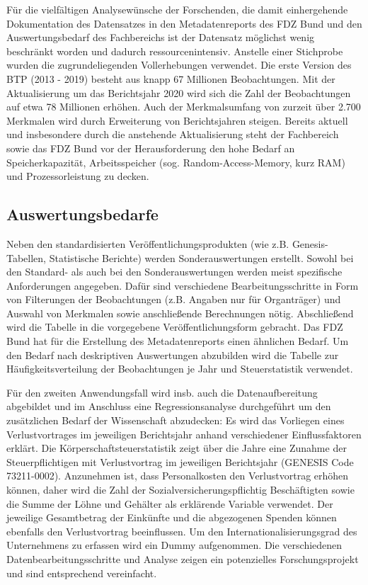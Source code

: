 \documentclass[
  german,
  10pt,
  twoside]{article}
\begin{document}
Für die vielfältigen Analysewünsche der Forschenden, die damit
einhergehende Dokumentation des Datensatzes in den Metadatenreports
\autocite{fdz2024btp} des FDZ Bund und den Auswertungsbedarf des
Fachbereichs ist der Datensatz möglichst wenig beschränkt worden und
dadurch ressourcenintensiv. Anstelle einer Stichprobe wurden die
zugrundeliegenden Vollerhebungen verwendet. Die erste Version des BTP
(2013 - 2019) besteht aus knapp 67 Millionen Beobachtungen. Mit der
Aktualisierung um das Berichtsjahr 2020 wird sich die Zahl der
Beobachtungen auf etwa 78 Millionen erhöhen. Auch der Merkmalsumfang von
zurzeit über 2.700 Merkmalen wird durch Erweiterung von Berichtsjahren
steigen. Bereits aktuell und insbesondere durch die anstehende
Aktualisierung steht der Fachbereich sowie das FDZ Bund vor der
Herausforderung den hohe Bedarf an Speicherkapazität, Arbeitsspeicher
(sog. Random-Access-Memory, kurz RAM) und Prozessorleistung zu decken.

\subsection{Auswertungsbedarfe}\label{auswertungsbedarfe}

Neben den standardisierten Veröffentlichungsprodukten (wie z.B.
Genesis-Tabellen, Statistische Berichte) werden Sonderauswertungen
erstellt. Sowohl bei den Standard- als auch bei den Sonderauswertungen
werden meist spezifische Anforderungen angegeben. Dafür sind
verschiedene Bearbeitungsschritte in Form von Filterungen der
Beobachtungen (z.B. Angaben nur für Organträger) und Auswahl von
Merkmalen sowie anschließende Berechnungen nötig. Abschließend wird die
Tabelle in die vorgegebene Veröffentlichungsform gebracht. Das FDZ Bund
hat für die Erstellung des Metadatenreports einen ähnlichen Bedarf. Um
den Bedarf nach deskriptiven Auswertungen abzubilden wird die Tabelle
zur Häufigkeitsverteilung der Beobachtungen je Jahr und Steuerstatistik
\autocite{fdz2024btp} verwendet.

Für den zweiten Anwendungsfall wird insb. auch die Datenaufbereitung
abgebildet und im Anschluss eine Regressionsanalyse durchgeführt um den
zusätzlichen Bedarf der Wissenschaft abzudecken: Es wird das Vorliegen
eines Verlustvortrages im jeweiligen Berichtsjahr anhand verschiedener
Einflussfaktoren erklärt. Die Körperschaftsteuerstatistik zeigt über die
Jahre eine Zunahme der Steuerpflichtigen mit Verlustvortrag im
jeweiligen Berichtsjahr (GENESIS Code 73211-0002). Anzunehmen ist, dass
Personalkosten den Verlustvortrag erhöhen können, daher wird die Zahl
der Sozialversicherungspflichtig Beschäftigten sowie die Summe der Löhne
und Gehälter als erklärende Variable verwendet. Der jeweilige
Gesamtbetrag der Einkünfte und die abgezogenen Spenden können ebenfalls
den Verlustvortrag beeinflussen. Um den Internationalisierungsgrad des
Unternehmens zu erfassen wird ein Dummy aufgenommen. Die verschiedenen
Datenbearbeitungsschritte und Analyse zeigen ein potenzielles
Forschungsprojekt und sind entsprechend vereinfacht.
\end{document}
